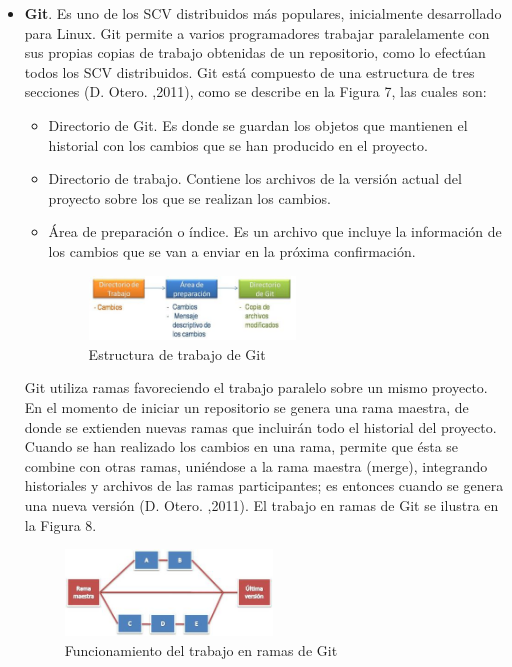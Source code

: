 \documentclass[a4paper,12pt]{article}
\begin{document}
{\begin{itemize}
	\item \textbf{Git}. Es uno de los SCV distribuidos más populares, inicialmente desarrollado para Linux. Git permite a varios programadores trabajar paralelamente con sus propias copias de trabajo obtenidas de un repositorio, como lo efectúan todos los SCV distribuidos. Git está compuesto de una estructura de tres secciones (D. Otero. ,2011), como se describe en la Figura 7, las cuales son:
	\begin{itemize}
		\item Directorio de Git. Es donde se guardan los objetos que mantienen el historial con los cambios que se han producido en el proyecto.
		\item Directorio de trabajo. Contiene los archivos de la versión actual del proyecto sobre los que se realizan los cambios.
		\item Área de preparación o índice. Es un archivo que incluye la información de los cambios que se van a enviar en la próxima confirmación.
		\begin{figure}[h]
			\centering
			\begin{minipage}[t]{5.5cm}
				\includegraphics[width=5.5cm]{grafico7.png}	 %
				\caption{Estructura de trabajo de Git}
			\end{minipage}
			
		\end{figure}
		
		
	\end{itemize}
	\newpage
	Git utiliza ramas favoreciendo el trabajo paralelo sobre un mismo proyecto. En el momento de iniciar un repositorio se genera una rama maestra, de donde se extienden nuevas ramas que incluirán todo el historial del proyecto. Cuando se han realizado los cambios en una rama, permite que ésta se combine con otras ramas, uniéndose a la rama maestra
	(merge), integrando historiales y archivos de las ramas participantes; es entonces cuando se genera una nueva versión (D. Otero. ,2011). El trabajo en ramas de Git se ilustra en la Figura 8.
	\begin{figure}[h]
		\centering
		\begin{minipage}[t]{5.5cm}
			\includegraphics[width=5.5cm]{grafico8.png}	 %
			\caption{Funcionamiento del trabajo en ramas de Git}
		\end{minipage}
		

\end{figure}
\end{itemize}}
\end{document}
